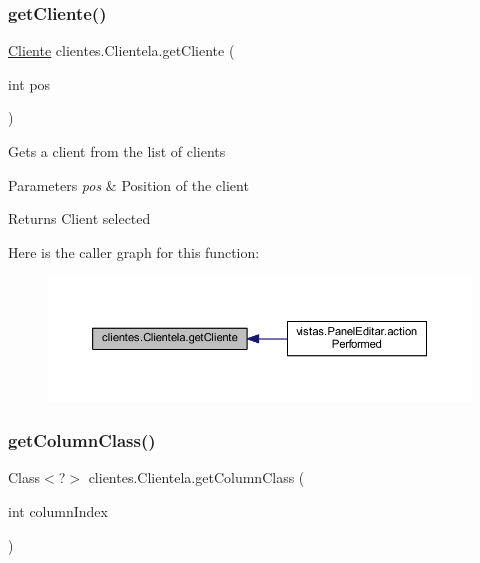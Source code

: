 \subsubsection{\texorpdfstring{get\+Cliente()}{getCliente()}}
{\footnotesize\ttfamily \mbox{\hyperlink{classclientes_1_1_cliente}{Cliente}} clientes.\+Clientela.\+get\+Cliente (\begin{DoxyParamCaption}\item[{int}]{pos }\end{DoxyParamCaption})}

Gets a client from the list of clients 
\begin{DoxyParams}{Parameters}
{\em pos} & Position of the client \\
\hline
\end{DoxyParams}
\begin{DoxyReturn}{Returns}
Client selected 
\end{DoxyReturn}
Here is the caller graph for this function\+:\nopagebreak
\begin{figure}[H]
\begin{center}
\leavevmode
\includegraphics[width=350pt]{classclientes_1_1_clientela_a1d531f14dc541569b84f1f72c760d376_icgraph}
\end{center}
\end{figure}
\mbox{\label{classclientes_1_1_clientela_af7d9f77f6b5b1582fcdb4df4b92551fd}} 
\subsubsection{\texorpdfstring{get\+Column\+Class()}{getColumnClass()}}
{\footnotesize\ttfamily Class$<$?$>$ clientes.\+Clientela.\+get\+Column\+Class (\begin{DoxyParamCaption}\item[{int}]{column\+Index }\end{DoxyParamCaption})}

